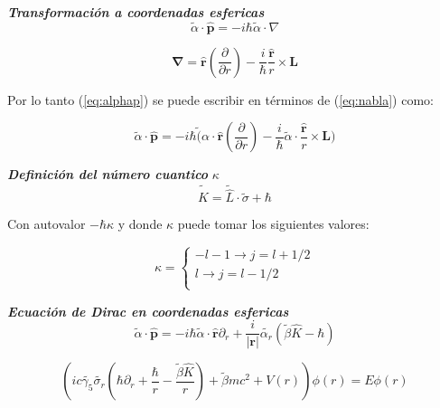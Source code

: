 \documentclass{beamer}
\begin{document}
\begin{frame}{\textit{\textbf{Transformaci\'on a coordenadas esfericas}}}
\begin{equation}\label{eq:alphap}
\widetilde{\alpha} \cdot \hat{\mathbf{p}} = -i \hbar \widetilde{\alpha} \cdot \nabla
\end{equation}

\begin{equation}\label{eq:nabla}
\mathbf{\nabla} =  \hat{\mathbf{r}}(\dfrac{\partial}{\partial r}) - \dfrac{i}{\hbar}\dfrac{\hat{\mathbf{r}}}{r} \times \mathbf{L}
\end{equation}

Por lo tanto (\ref{eq:alphap}) se puede escribir en t\'erminos de (\ref{eq:nabla}) como:

\begin{equation}\label{eq:alphap2}
\widetilde{\alpha}\cdot \mathbf{\hat{p}} = -i\hbar \widetilde({\alpha}\cdot \hat{\mathbf{r}}(\dfrac{\partial}{\partial r}) - 
\dfrac{i}{\hbar}\widetilde{\alpha}\cdot \dfrac{\hat{\mathbf{r}}}{r} \times \mathbf{L})
\end{equation}
\end{frame}

\begin{frame}{\textbf{\textit{Definici\'on del n\'umero cuantico}} $\kappa$}
\begin{equation}
\widetilde{\hat{K}} = \widetilde{\hat{L}}\cdot \widetilde{\sigma} + \hbar
\end{equation}

Con autovalor $-\hbar \kappa$ y donde $\kappa$ puede tomar los siguientes
valores:

\[ \kappa = 
\begin{cases}
-l - 1 \rightarrow j = l + 1/2  \\
l \rightarrow j = l - 1/2 \\ 
\end{cases}
\]  

\end{frame}

\begin{frame}{\textit{\textbf{Ecuaci\'on de Dirac en coordenadas esfericas}}}
\begin{equation}\label{alphap4}
\widetilde{\alpha} \cdot \mathbf{\hat{p}} = -i\hbar \widetilde{\alpha}\cdot \hat{\mathbf{r}}\partial_r + \dfrac{i}{|\mathbf{r}|} \widetilde{\alpha_r}(\widetilde{\beta}\hat{K}-\hbar)
\end{equation}

\begin{equation}\label{eq:radialdirac}
\left (ic\widetilde{\gamma_5}\widetilde{\sigma_r} \left (\hbar \partial_r + \dfrac{\hbar}{r} -  \dfrac{\widetilde{\beta}\hat{K}}{r}\right )  + \widetilde{\beta} m c^2 + V(r) \right ) \phi(r) = E \phi (r)
\end{equation}

\end{frame}
\end{document}
